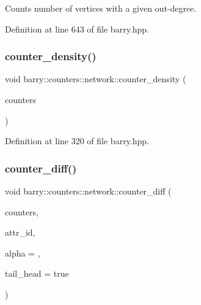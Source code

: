 Counts number of vertices with a given out-\/degree. 



Definition at line 643 of file barry.\+hpp.

\mbox{\label{namespacebarry_1_1counters_1_1network_a313ba439c81c589759cbbc613d12e80b}} 
\subsubsection{\texorpdfstring{counter\+\_\+density()}{counter\_density()}}
{\footnotesize\ttfamily void barry\+::counters\+::network\+::counter\+\_\+density (\begin{DoxyParamCaption}\item[{\hyperlink{namespacebarry_1_1counters_1_1network_a3b3c590303d47840d1967372ae495d95}{Net\+Counter\+Vector} $\ast$}]{counters }\end{DoxyParamCaption})\hspace{0.3cm}{\ttfamily [inline]}}



Definition at line 320 of file barry.\+hpp.

\mbox{\label{namespacebarry_1_1counters_1_1network_af8f024a17f6c518aef79c2cf670e49f5}} 
\subsubsection{\texorpdfstring{counter\+\_\+diff()}{counter\_diff()}}
{\footnotesize\ttfamily void barry\+::counters\+::network\+::counter\+\_\+diff (\begin{DoxyParamCaption}\item[{\hyperlink{namespacebarry_1_1counters_1_1network_a3b3c590303d47840d1967372ae495d95}{Net\+Counter\+Vector} $\ast$}]{counters,  }\item[{\hyperlink{namespacebarry_a11dfc53ddb4672278319aa04f1e09a6c}{uint}}]{attr\+\_\+id,  }\item[{double}]{alpha = {},  }\item[{double}]{tail\+\_\+head = {\ttfamily true} }\end{DoxyParamCaption})\hspace{0.3cm}{\ttfamily [inline]}}



